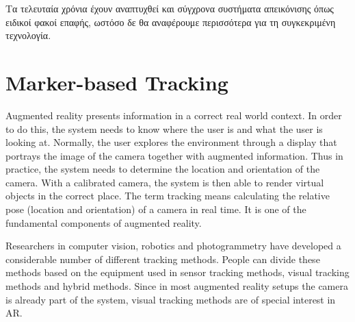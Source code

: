 Τα τελευταία χρόνια έχουν αναπτυχθεί και σύγχρονα συστήματα απεικόνισης όπως ειδικοί φακοί επαφής, ωστόσο δε θα αναφέρουμε περισσότερα για τη συγκεκριμένη τεχνολογία.







\section{Marker-based Tracking}


Augmented reality presents information in a correct real world context. In order to do this, the system needs to know where the user is and what the user is looking at. Normally, the user explores the environment through a display that portrays the image of the camera together with augmented information. Thus in practice, the system needs to determine the location and orientation of the camera. With a calibrated camera, the system is then able to render virtual objects in the correct place. The term tracking means calculating the relative pose (location and orientation) of a camera in real time. It is one of the fundamental components of augmented reality.

Researchers in computer vision, robotics and photogrammetry have developed a considerable number of different tracking methods. People can divide these methods based on the equipment used in sensor tracking methods, visual tracking methods and hybrid methods. Since in most augmented reality setups the camera is already part of the system, visual tracking methods are of special interest in AR.

